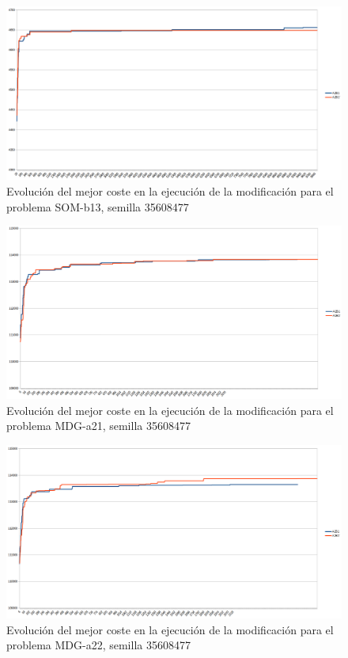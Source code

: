 	\begin{figure}[H]
		\centering
		\includegraphics[scale=0.3]{img/convergenciaSOM3mejora.png}
		\caption{Evolución del mejor coste en la ejecución de la modificación para el problema SOM-b13, semilla 35608477}
		\label{SOM-b_13_convergencia_mejora}
	\end{figure}

	\begin{figure}[H]
		\centering
		\includegraphics[scale=0.3]{img/convergenciaMDG1mejora.png}
		\caption{Evolución del mejor coste en la ejecución de la modificación para el problema MDG-a21, semilla 35608477}
		\label{MDG-a_21_convergencia_mejora}
	\end{figure}

	\begin{figure}[H]
		\centering
		\includegraphics[scale=0.3]{img/convergenciaMDG2mejora.png}
		\caption{Evolución del mejor coste en la ejecución de la modificación para el problema MDG-a22, semilla 35608477}
		\label{MDG-a_22_convergencia_mejora}
	\end{figure}

